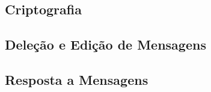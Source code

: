 \documentclass[../main.tex]{subfiles}
\begin{document}
\subsection{Criptografia}



\subsection{Deleção e Edição de Mensagens}



\subsection{Resposta a Mensagens}


\end{document}
